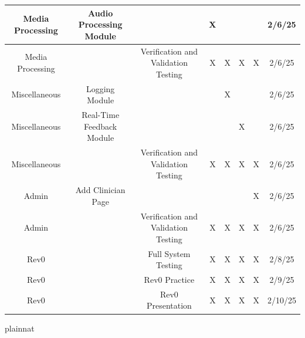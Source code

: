 \documentclass[12pt, titlepage]{article}
\begin{document}
\begin{landscape}
\begin{longtable}{|c|c|c|c|c|c|c|c|}
      Media Processing & Audio Processing Module & ~ & X & ~ & ~ & ~ & 2/6/25 \\ \hline
      Media Processing & ~ & Verification and Validation Testing & X & X & X & X & 2/6/25 \\ \hline
      Miscellaneous & Logging Module & ~ & ~ & X & ~ & ~ & 2/6/25 \\ \hline
      Miscellaneous & Real-Time Feedback Module & ~ & ~ & ~ & X & ~ & 2/6/25 \\ \hline
      Miscellaneous & ~ & Verification and Validation Testing & X & X & X & X & 2/6/25 \\ \hline
      Admin & Add Clinician Page & ~ & ~ & ~ & ~ & X & 2/6/25 \\ \hline
      Admin & ~ & Verification and Validation Testing & X & X & X & X & 2/6/25 \\ \hline
      Rev0 & ~ & Full System Testing & X & X & X & X & 2/8/25 \\ \hline
      Rev0 & ~ & Rev0 Practice & X & X & X & X & 2/9/25 \\ \hline
      Rev0 & ~ & Rev0 Presentation & X & X & X & X & 2/10/25 \\ \hline
\end{longtable}
\normalsize
\end{landscape}

 {plainnat}


\newpage{}
\end{document}
